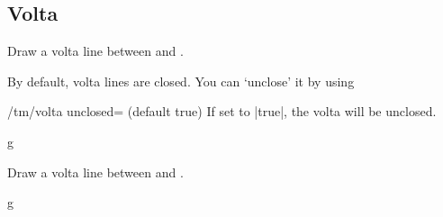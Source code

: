 \subsection{Volta}\label{sec:line:volta}
\begin{command}{\tmvolta{}}
  Draw a volta line between  and .
\end{command}
By default, volta lines are closed. You can `unclose' it by using
\begin{key}{/tm/volta unclosed= (default true)}
  If set to |true|, the volta will be unclosed.
\end{key}
\begin{codeexample}[]
\begin{tmline}
\begin{tmstaff}{g}{}
\end{tmstaff}
\end{tmline}
\end{codeexample}
\begin{command}{\tmvoltacoordinate{}}
  Draw a volta line between  and .
\end{command}
\begin{codeexample}[]
\begin{tmline}
  \begin{tmstaff}{g}{}
  \end{tmstaff}
\end{tmline}
\end{codeexample}
